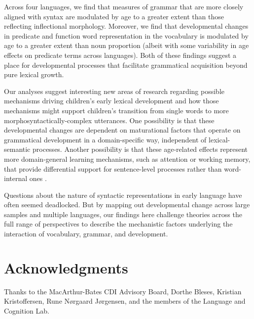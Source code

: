 \documentclass[10pt,letterpaper]{article}
\begin{document}
Across four languages, we find that measures of grammar that are more closely aligned with syntax are modulated by age to a greater extent than those reflecting inflectional morphology.  Moreover, we find that developmental changes in predicate and function word representation in the vocabulary is modulated by age to a greater extent than noun proportion (albeit with some variability in age effects on predicate terms across languages). Both of these findings suggest a place for developmental processes that facilitate grammatical acquisition beyond pure lexical growth.

Our analyses suggest interesting new areas of research regarding possible mechanisms driving children's early lexical development and how those mechanisms might support children's transition from single words to more morphosyntactically-complex utterances.  One possibility is that these developmental changes are dependent on maturational factors that operate on grammatical development in a domain-specific way, independent of lexical-semantic processes.  Another possibility is that these age-related effects represent more domain-general learning mechanisms, such as attention or working memory, that provide differential support for sentence-level processes rather than word-internal ones \cite{gathercole2014}.

Questions about the nature of syntactic representations in early language have often seemed deadlocked. But by mapping out developmental change across large samples and multiple languages, our findings here challenge theories across the full range of perspectives to describe the mechanistic factors underlying the interaction of vocabulary, grammar, and development. 



\section{Acknowledgments}

Thanks to the MacArthur-Bates CDI Advisory Board, Dorthe Bleses, Kristian Kristoffersen, Rune N\o rgaard J\o rgensen, and the members of the Language and Cognition Lab. 



\setlength{\bibleftmargin}{.125in}
\setlength{\bibindent}{-\bibleftmargin}


\end{document}
